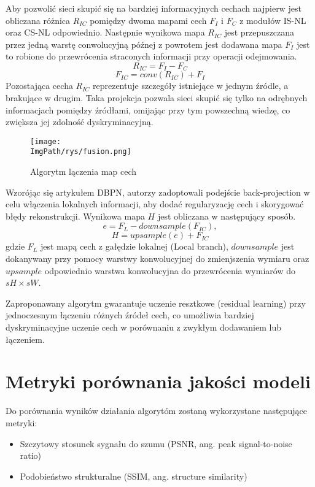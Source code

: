 \documentclass[a4paper,12pt,twoside,openany]{report}
\newcommand{\ImgPath}{.}
\begin{document}
	Aby pozwolić sieci skupić się na bardziej informacyjnych cechach najpierw jest obliczana różnica $R_{IC}$ pomiędzy dwoma mapami cech $F_I$ i $F_C$  z modułów  IS-NL oraz CS-NL odpowiednio. Następnie wynikowa mapa $R_{IC}$ jest przepuszczana przez jedną warstę conwolucyjną późnej z powrotem jest dodawana mapa $F_I$ jest to robione do przewrócenia straconych informacji przy operacji odejmowania.
	\begin{equation}
		R_{IC}  = F_I - F_C
		\label{RIC}
	\end{equation}
	\begin{equation}
		F_{IC} = conv(R_{IC}) + F_I
 		\label{FIC}
	\end{equation}
	Pozostająca cecha $R_{IC}$ reprezentuje szczegóły istniejące w jednym źródle, a brakujące w drugim. Taka projekcja pozwala sieci skupić się tylko na odrębnych informacjach pomiędzy źródłami, omijając przy tym powszechną wiedzę, co zwiększa jej zdolność dyskryminacyjną.
	\begin{figure}[!htbp]
		\begin{center}
			\centering
			\texttt{[image: \\ImgPath/rys/fusion.png]}
		\end{center}
		\caption{Algorytm lączenia map cech}
		\label{Fusion}
	\end{figure} 
	
	Wzorójąc się artykułem DBPN, autorzy zadoptowali podejście back-projection w celu włączenia lokalnych informacji, aby dodać regularyzację cech i skorygować błędy rekonstrukcji. Wynikowa mapa $H$ jest obliczana w następujący sposób. 
	\begin{equation}
		e = F_L - downsample(F_{IC}),
		\label{RIC}
	\end{equation}
	\begin{equation}
		H = upsample(e) + F_{IC}
		\label{FIC}
	\end{equation}
	gdzie $F_L$ jest mapą cech z gałędzie lokalnej (Local branch), $downsample$ jest dokanywany przy pomocy warstwy konwolucyjnej do zmienjszenia wymiaru oraz $upsample$ odpowiednio warstwa konwolucyjna do przewrócenia wymiarów do $sH \times sW$. 
	
	Zaproponawany algorytm gwarantuje uczenie resztkowe (residual learning) przy jednoczesnym łączeniu różnych źródeł cech, co umożliwia bardziej dyskryminacyjne uczenie cech w porównaniu z zwykłym dodawaniem lub łączeniem.
\section{Metryki porównania jakości modeli}
Do porównania wyników działania algorytóm zostaną wykorzystane następujące metryki:
\begin{itemize}
	\item Szczytowy stosunek sygnału do szumu (PSNR, ang. peak signal-to-noise ratio)
	\item Podobieństwo strukturalne (SSIM, ang. structure similarity) 
\end{itemize}
\end{document}
